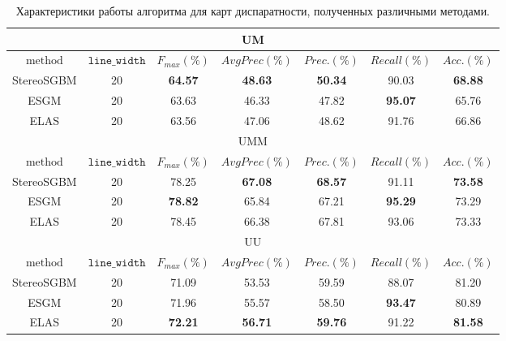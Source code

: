 \documentclass[oneside,final,12pt]{scrartcl}
\begin{document}
	\begin{table}[p]
		\centering
		\caption{Характеристики работы алгоритма для карт диспаратности, полученных различными методами.}
		\label{tb:algs}
		\begin{tabular}{|c|c|c|c|c|c|c|}
			\hline
			\multicolumn{7}{|c|}{UM}  \\
			\hline
			\(\text{method}\) & \(\texttt{line\_width}\) & \(F_{max}(\%)\) & \(AvgPrec(\%)\) & \(Prec.(\%)\) & \(Recall(\%)\) & \(Acc.(\%)\) \\
			\hline
			StereoSGBM & 20 & \textbf{64.57} & \textbf{48.63} & \textbf{50.34} & 90.03 & \textbf{68.88} \\
			\hline
			ESGM & 20 & 63.63 & 46.33 & 47.82 & \textbf{95.07} & 65.76 \\
			\hline
			ELAS & 20 & 63.56 & 47.06 & 48.62 & 91.76 & 66.86 \\
			\hline
			\hline
			\multicolumn{7}{|c|}{UMM}  \\
			\hline
			\(\text{method}\) & \(\texttt{line\_width}\) & \(F_{max}(\%)\) & \(AvgPrec(\%)\) & \(Prec.(\%)\) & \(Recall(\%)\) & \(Acc.(\%)\) \\
			\hline
			StereoSGBM & 20 & 78.25 & \textbf{67.08} & \textbf{68.57} & 91.11 & \textbf{73.58} \\
			\hline
			ESGM & 20 & \textbf{78.82} & 65.84 & 67.21 & \textbf{95.29} & 73.29 \\
			\hline
			ELAS & 20 & 78.45 & 66.38 & 67.81 & 93.06 & 73.33 \\
			\hline
			\hline
			\multicolumn{7}{|c|}{UU}  \\
			\hline
			\(\text{method}\) & \(\texttt{line\_width}\) & \(F_{max}(\%)\) & \(AvgPrec(\%)\) & \(Prec.(\%)\) & \(Recall(\%)\) & \(Acc.(\%)\) \\
			\hline
			StereoSGBM  & 20 & 71.09 & 53.53 & 59.59 & 88.07 & 81.20 \\
			\hline
			ESGM & 20 & 71.96 & 55.57 & 58.50 & \textbf{93.47} & 80.89 \\
			\hline
			ELAS & 20 & \textbf{72.21} & \textbf{56.71} & \textbf{59.76} & 91.22 & \textbf{81.58} \\
			\hline
		\end{tabular}
	\end{table}
\end{document}
